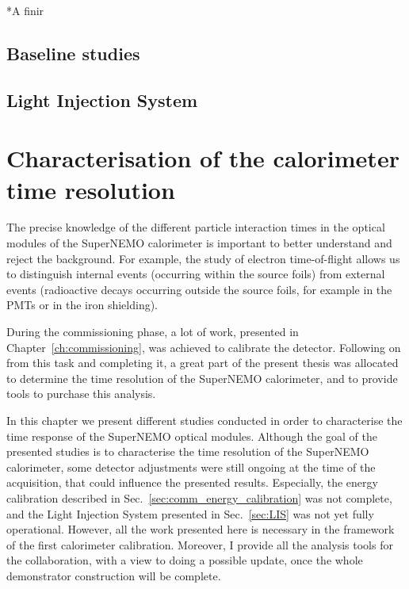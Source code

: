 *A finir\\




\section{Baseline studies}
\label{sec:comm_baseline}

\section{Light Injection System}
\label{sec:LI}






\chapter{Characterisation of the calorimeter time resolution}

The precise knowledge of the different particle interaction times in the optical modules of the SuperNEMO calorimeter is important to better understand and reject the background.
For example, the study of electron time-of-flight allows us to distinguish internal events (occurring within the source foils) from external events (radioactive decays occurring outside the source foils, for example in the PMTs or in the iron shielding).

During the commissioning phase, a lot of work, presented in Chapter~\ref{ch:commissioning}, was achieved to calibrate the detector.
Following on from this task and completing it, a great part of the present thesis was allocated to determine the time resolution of the SuperNEMO calorimeter, and to provide tools to purchase this analysis.

In this chapter we present different studies conducted in order to characterise the time response of the SuperNEMO optical modules.
Although the goal of the presented studies is to characterise the time resolution of the SuperNEMO calorimeter, some detector adjustments were still ongoing at the time of the acquisition, that could influence the presented results.
Especially, the energy calibration described in Sec.~\ref{sec:comm_energy_calibration} was not complete, and the Light Injection System presented in Sec.~\ref{sec:LIS} was not yet fully operational.
However, all the work presented here is necessary in the framework of the first calorimeter calibration.
Moreover, I provide all the analysis tools for the collaboration, with a view to doing a possible update, once the whole demonstrator construction will be complete.

